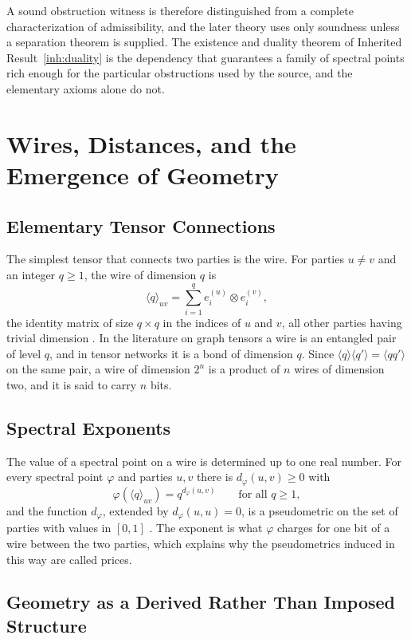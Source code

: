 \documentclass[11pt,letterpaper]{report}
\theoremstyle{plain}
\theoremstyle{definition}
\theoremstyle{remark}
\begin{document}
A sound obstruction witness is therefore distinguished from a complete characterization of admissibility, and the later theory uses only soundness unless a separation theorem is supplied. The existence and duality theorem of Inherited Result~\ref{inh:duality} is the dependency that guarantees a family of spectral points rich enough for the particular obstructions used by the source, and the elementary axioms alone do not.

\chapter{Wires, Distances, and the Emergence of Geometry}

\section{Elementary Tensor Connections}

The simplest tensor that connects two parties is the wire. For parties $u\ne v$ and an integer $q\ge1$, the wire of dimension $q$ is
\[
\langle q\rangle_{uv}=\sum_{i=1}^{q}e_i^{(u)}\otimes e_i^{(v)},
\]
the identity matrix of size $q\times q$ in the indices of $u$ and $v$, all other parties having trivial dimension \cite{Source2026}. In the literature on graph tensors a wire is an entangled pair of level $q$, and in tensor networks it is a bond of dimension $q$. Since $\langle q\rangle\langle q'\rangle=\langle qq'\rangle$ on the same pair, a wire of dimension $2^n$ is a product of $n$ wires of dimension two, and it is said to carry $n$ bits.

\section{Spectral Exponents}

The value of a spectral point on a wire is determined up to one real number. For every spectral point $\varphi$ and parties $u,v$ there is $d_\varphi(u,v)\ge0$ with
\[
\varphi(\langle q\rangle_{uv})=q^{d_\varphi(u,v)}\qquad\text{for all }q\ge1,
\]
and the function $d_\varphi$, extended by $d_\varphi(u,u)=0$, is a pseudometric on the set of parties with values in $[0,1]$ \cite{Source2026}. The exponent is what $\varphi$ charges for one bit of a wire between the two parties, which explains why the pseudometrics induced in this way are called prices.

\section{Geometry as a Derived Rather Than Imposed Structure}
\end{document}
